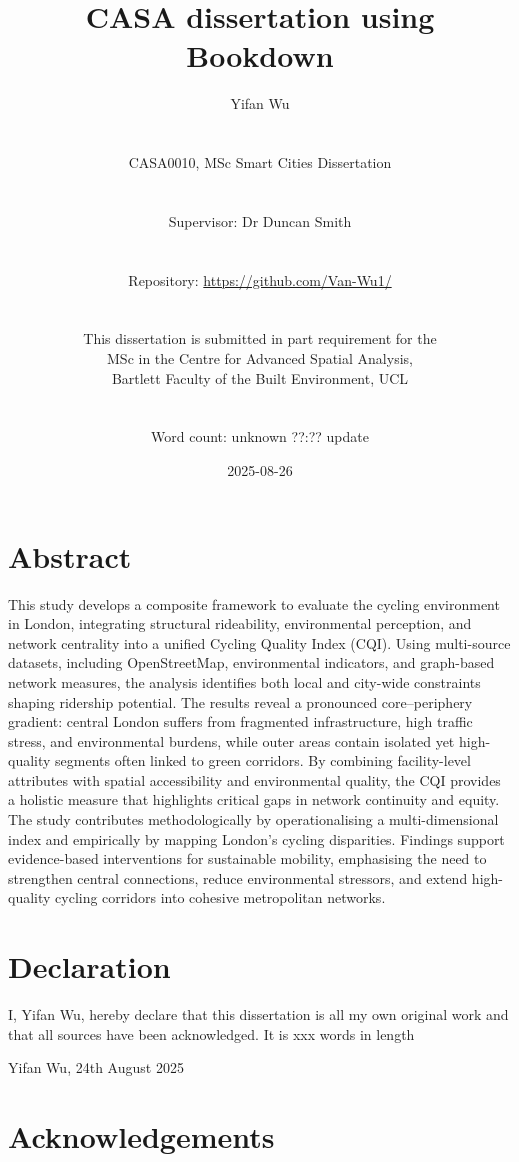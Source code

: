 \documentclass[
  12pt,
  oneside]{book}
\title{CASA dissertation using Bookdown}
\author{Yifan Wu\\
\strut \\
CASA0010, MSc Smart Cities Dissertation\\
\strut \\
Supervisor: Dr Duncan Smith\\
\strut \\
Repository: \url{https://github.com/Van-Wu1/}\\
\strut \\
This dissertation is submitted in part requirement for the\\
MSc in the Centre for Advanced Spatial Analysis,\\
Bartlett Faculty of the Built Environment, UCL\\
\strut \\
Word count: unknown ??:?? update}
\date{2025-08-26}
\begin{document}
\maketitle


\chapter*{Abstract}\label{abstract}

This study develops a composite framework to evaluate the cycling environment in London, integrating structural rideability, environmental perception, and network centrality into a unified Cycling Quality Index (CQI). Using multi-source datasets, including OpenStreetMap, environmental indicators, and graph-based network measures, the analysis identifies both local and city-wide constraints shaping ridership potential. The results reveal a pronounced core--periphery gradient: central London suffers from fragmented infrastructure, high traffic stress, and environmental burdens, while outer areas contain isolated yet high-quality segments often linked to green corridors. By combining facility-level attributes with spatial accessibility and environmental quality, the CQI provides a holistic measure that highlights critical gaps in network continuity and equity. The study contributes methodologically by operationalising a multi-dimensional index and empirically by mapping London's cycling disparities. Findings support evidence-based interventions for sustainable mobility, emphasising the need to strengthen central connections, reduce environmental stressors, and extend high-quality cycling corridors into cohesive metropolitan networks.


\chapter*{Declaration}\label{declaration}

I, Yifan Wu, hereby declare that this dissertation is all my own original work and that all sources have been acknowledged. It is xxx words in length

Yifan Wu, 24th August 2025

\chapter*{Acknowledgements}\label{acknowledgements}
\end{document}
